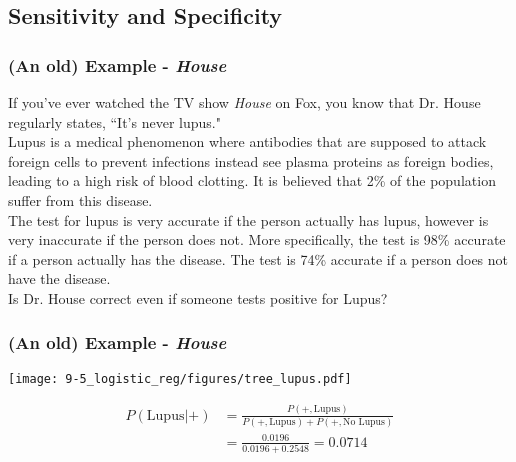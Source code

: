 
\subsection{Sensitivity and Specificity}


\begin{frame}
\frametitle{(An old) Example - \emph{House}}

If you've ever watched the TV show \emph{House} on Fox, you know that Dr. House regularly states, ``It's never lupus." \\
\vspace{3mm}
Lupus is a medical phenomenon where antibodies that are supposed to attack foreign cells to prevent infections instead see plasma proteins as foreign bodies, leading to a high risk of blood clotting. It is believed that 2\% of the population suffer from this disease. \\
\vspace{3mm}
The test for lupus is very accurate if the person actually has lupus, however is very inaccurate if the person does not. More specifically, the test is 98\% accurate if a person actually has the disease. The test is 74\% accurate if a person does not have the disease. \\
\vspace{3mm}
Is Dr. House correct even if someone tests positive for Lupus? 

\end{frame}


\begin{frame}
\frametitle{(An old) Example - \emph{House}}

\begin{center}
\texttt{[image: 9-5\_logistic\_reg/figures/tree\_lupus.pdf]}
\end{center}

{\footnotesize
\begin{align*}
P(\text{Lupus} | +)  &= \frac{P(+,\text{Lupus})}{P(+,\text{Lupus})+P(+,\text{No Lupus})} \\
                     &= \frac{0.0196}{0.0196+0.2548} = 0.0714
\end{align*}
}
\end{frame}


